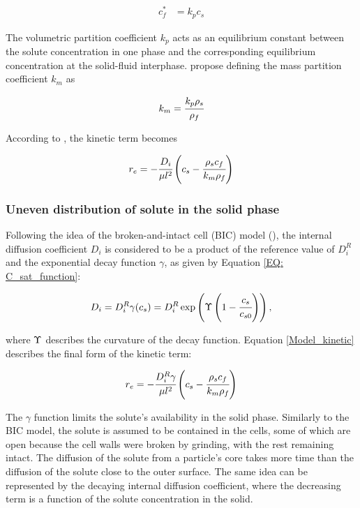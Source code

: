 \documentclass[a4paper,fleqn]{cas-dc}
\begin{document}
	{\footnotesize
		\begin{align} \label{Linear_equilibirum}
			c_f^* &= k_p c_s
	\end{align} }
	
	The volumetric partition coefficient $k_p$ acts as an equilibrium constant between the solute concentration in one phase and the corresponding equilibrium concentration at the solid-fluid interphase. \citet{Spiro2007} propose defining the mass partition coefficient $k_m$ as 
	
	{\footnotesize
		\begin{align}
			k_m = \cfrac{k_p \rho_s}{\rho_f}
	\end{align} }
	
	According to \citet{Reverchon1996}, the kinetic term becomes
	
	{\footnotesize
		\begin{equation}
			\label{Model_kinetic_no_sat}
			r_e = -\cfrac{D_i}{ \mu l^2 } \left(c_s - \cfrac{\rho_s c_f}{k_m \rho_f} \right)
	\end{equation} }
	
	\subsubsection{Uneven distribution of solute in the solid phase} \label{CH: Gamma_Function}
	
	Following the idea of the broken-and-intact cell (BIC) model (\citet{Sovova2017}), the internal diffusion coefficient $D_i$ is considered to be a product of the reference value of $D_i^R$ and the exponential decay function $\gamma$, as given by Equation \ref{EQ: C_sat_function}:
	
	{\footnotesize
		\begin{equation}
			D_i = D_i^R \gamma(c_s) = D_i^R \exp \left( \Upsilon \left( 1-\cfrac{ c_s }{c_{s0}} \right) \right), \label{EQ: C_sat_function}
	\end{equation} }
	
	where  ${\color{black}\Upsilon}$ describes the curvature of the decay function. Equation \ref{Model_kinetic} describes the final form of the kinetic term:
	
	{\footnotesize
		\begin{equation}
			\label{Model_kinetic}
			r_e = -\cfrac{D_i^R \gamma }{ \mu l^2 } \left( c_s  - \cfrac{\rho_s c_f }{ k_m \rho_f }  \right)
	\end{equation} }
	
	The $\gamma$ function limits the solute's availability in the solid phase. Similarly to the BIC model, the solute is assumed to be contained in the cells, some of which are open because the cell walls were broken by grinding, with the rest remaining intact. The diffusion of the solute from a particle's core takes more time than the diffusion of the solute close to the outer surface. The same idea can be represented by the decaying internal diffusion coefficient, where the decreasing term is a function of the solute concentration in the solid. 
	
\end{document}
